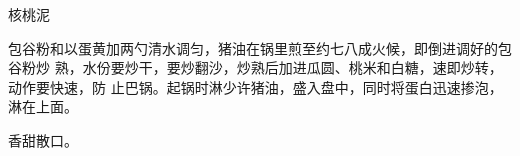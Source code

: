 %
%
%
%
%
%
%
\begin{recipe}{核桃泥}

\ingredients


\preparation

包谷粉和以蛋黄加两勺清水调匀，猪油在锅里煎至约七八成火候，即倒进调好的包谷粉炒
熟，水份要炒干，要炒翻沙，炒熟后加进瓜圆、桃米和白糖，速即炒转，动作要快速，防
止巴锅。起锅时淋少许猪油，盛入盘中，同时将蛋白迅速掺泡，淋在上面。

\features

香甜散口。

\end{recipe}

